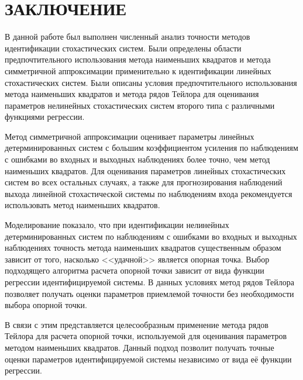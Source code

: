 \chapter*{ЗАКЛЮЧЕНИЕ}

В данной работе был выполнен численный анализ точности методов идентификации
стохастических систем.
Были определены области предпочтительного использования
метода наименьших квадратов и метода симметричной аппроксимации применительно к
идентификации линейных стохастических систем.
Были описаны условия предпочтительного использования метода наименьших квадратов
и метода рядов Тейлора для оценивания параметров нелинейных стохастических систем
второго типа с различными функциями регрессии.

Метод симметричной аппроксимации оценивает параметры линейных детерминированных систем
с большим коэффициентом усиления по наблюдениям с ошибками во входных и выходных наблюдениях
более точно, чем метод наименьших квадратов.
Для оценивания параметров линейных стохастических систем во всех остальных случаях,
а также для прогнозирования наблюдений выхода линейной стохастической системы по
наблюдениям входа рекомендуется использовать метод наименьших квадратов.

Моделирование показало, что при идентификации нелинейных детерминированных систем по
наблюдениям с ошибками во входных и выходных наблюдениях точность метода наименьших
квадратов существенным образом зависит от того, насколько <<удачной>> является опорная точка.
Выбор подходящего алгоритма расчета опорной точки зависит от вида функции
регрессии идентифицируемой системы.
В данных условиях метод рядов Тейлора позволяет получать оценки параметров
приемлемой точности без необходимости выбора опорной точки.

В связи с этим представляется целесообразным применение метода рядов Тейлора
для расчета опорной точки, используемой для оценивания параметров методом наименьших квадратов.
Данный подход позволит получать точные оценки параметров идентифицируемой системы
независимо от вида её функции регрессии.

